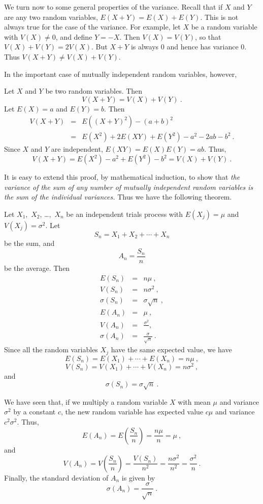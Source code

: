 We turn now to some general properties of the variance.  Recall that if $X$ and
$Y$ are any two random variables, $E(X + Y) = E(X) + E(Y)$.  This is not always true
for the case of the variance.  For example, let $X$ be a random variable with
$V(X) \ne 0$, and define $Y = -X$.  Then $V(X) = V(Y)$, so that $V(X) + V(Y) =
2V(X)$.  But
$X + Y$ is always 0 and hence has variance 0.  Thus $V(X + Y) \ne V(X) + V(Y)$.
\par In the important case of mutually independent random variables, however,  

\begin{theorem}\label{thm 6.8} Let $X$ and $Y$ be two   random
variables.  Then 
$$V(X + Y) = V(X) + V(Y)\ .$$
\proof Let $E(X) = a$ and $E(Y) = b$.  Then
\begin{eqnarray*} V(X + Y) & = & E((X + Y)^2) - (a + b)^2 \\
         & = & E(X^2) + 2E(XY) + E(Y^2) - a^2 - 2ab - b^2\ .
\end{eqnarray*} Since $X$ and $Y$ are independent, $E(XY) = E(X)E(Y) = ab$.  Thus,
$$ V(X + Y) = E(X^2) - a^2 + E(Y^2) - b^2 = V(X) + V(Y)\ .
$$
\end{theorem}

It is easy to extend this proof, by mathematical induction, to show that {\em
the variance of the sum of any number of mutually independent random variables is the sum
of the individual variances.}  Thus we have the following theorem.

\begin{theorem}\label{thm 6.9} Let $X_1$,~$X_2$, \dots,~$X_n$ be an independent
trials process with $E(X_j) =
\mu$ and $V(X_j) = \sigma^2$.  Let
$$ S_n = X_1 + X_2 +\cdots+ X_n
$$ be the sum, and
$$ A_n = \frac {S_n}n
$$ be the average.  Then
\begin{eqnarray*} E(S_n) &=& n\mu\ , \\
V(S_n) &=& n\sigma^2\ , \\ 
\sigma(S_n) &=& \sigma \sqrt{n}\ , \\
E(A_n) &=& \mu\ , \\
V(A_n) &=& \frac {\sigma^2}\ , \\
\sigma(A_n) &=& \frac{\sigma}{\sqrt n}\ .
\end{eqnarray*}
\proof Since all the random variables $X_j$ have the same expected value, we have
$$ E(S_n) = E(X_1) +\cdots+ E(X_n) = n\mu\ ,
$$ 
$$ V(S_n) = V(X_1) +\cdots+ V(X_n) = n\sigma^2\ ,
$$
and
$$\sigma(S_n) = \sigma \sqrt{n}\ .$$

We have seen that, if we multiply a random variable $X$ with mean $\mu$ and variance
$\sigma^2$ by a constant $c$, the new random variable has expected value $c\mu$ and
variance $c^2\sigma^2$.  Thus,
$$ E(A_n) = E\left(\frac {S_n}n \right) = \frac {n\mu}n = \mu\ ,
$$ and
$$ V(A_n) = V\left( \frac {S_n}n \right) = \frac {V(S_n)}{n^2} = \frac
{n\sigma^2}{n^2} = \frac {\sigma^2}n\ .
$$ 
Finally, the standard deviation of $A_n$ is given by
$$\sigma(A_n) = \frac {\sigma}{\sqrt n}\ .$$
\end{theorem}

